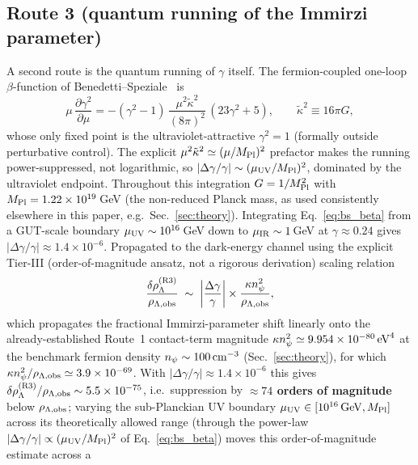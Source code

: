 \documentclass[aps,prd,twocolumn,superscriptaddress,preprintnumbers,nofootinbib,longbibliography,floatfix]{revtex4-2}
\newcommand{\MPl}{M_{\rm Pl}}
\begin{document}
\subsection{Route 3 (quantum running of the Immirzi parameter)}
A second route is the quantum running of $\gamma$ itself. The
fermion-coupled one-loop $\beta$-function of
Benedetti--Speziale~\cite{BenedettiSpeziale2011run} is
\begin{equation}\label{eq:bs_beta}
\mu\,\frac{\partial\gamma^2}{\partial\mu}=
-(\gamma^2-1)\,\frac{\mu^2\tilde\kappa^2}{(8\pi)^2}\,(23\gamma^2+5),
\qquad\tilde\kappa^2\equiv16\pi G,
\end{equation}
whose only fixed point is the ultraviolet-attractive $\gamma^2=1$
(formally outside perturbative control). The explicit
$\mu^2\tilde\kappa^2\simeq(\mu/\MPl)^2$ prefactor makes the running
power-suppressed, not logarithmic, so
$|\Delta\gamma/\gamma|\sim(\mu_{\rm UV}/\MPl)^2$, dominated by the
ultraviolet endpoint. Throughout this integration $G=1/\MPl^2$ with
$\MPl=1.22\times10^{19}\,$GeV (the non-reduced Planck mass, as used
consistently elsewhere in this paper, e.g.\ Sec.~\ref{sec:theory}).
Integrating Eq.~\eqref{eq:bs_beta} from a
GUT-scale boundary $\mu_{\rm UV}\sim10^{16}\,$GeV down to
$\mu_{\rm IR}\sim1\,$GeV at $\gamma\approx0.24$ gives
$|\Delta\gamma/\gamma|\approx1.4\times10^{-6}$. Propagated to the
dark-energy channel using the explicit Tier-III (order-of-magnitude
ansatz, not a rigorous derivation) scaling relation
\begin{equation}\label{eq:route3_scaling}
\frac{\delta\rho_\Lambda^{(\rm R3)}}{\rho_{\Lambda,\rm obs}}\;\sim\;
\left|\frac{\Delta\gamma}{\gamma}\right|\times
\frac{\kappa n_\psi^2}{\rho_{\Lambda,\rm obs}},
\end{equation}
which propagates the fractional Immirzi-parameter shift linearly onto
the already-established Route~1 contact-term magnitude
$\kappa n_\psi^2\simeq9.954\times10^{-80}\,{\rm eV}^4$ at the
benchmark fermion density $n_\psi\sim100\,{\rm cm}^{-3}$
(Sec.~\ref{sec:theory}), for which
$\kappa n_\psi^2/\rho_{\Lambda,\rm obs}\simeq3.9\times10^{-69}$.
With $|\Delta\gamma/\gamma|\approx1.4\times10^{-6}$ this gives
$\delta\rho_\Lambda^{(\rm R3)}/\rho_{\Lambda,\rm obs}\sim
5.5\times10^{-75}$, i.e.\ suppression by \textbf{$\approx74$ orders of
magnitude} below $\rho_{\Lambda,\rm obs}$; varying the sub-Planckian UV
boundary $\mu_{\rm UV}\in[10^{16}\,{\rm GeV},\MPl]$ across its
theoretically allowed range (through the power-law
$|\Delta\gamma/\gamma|\propto(\mu_{\rm UV}/\MPl)^2$ of
Eq.~\eqref{eq:bs_beta}) moves this order-of-magnitude estimate across a
\end{document}
